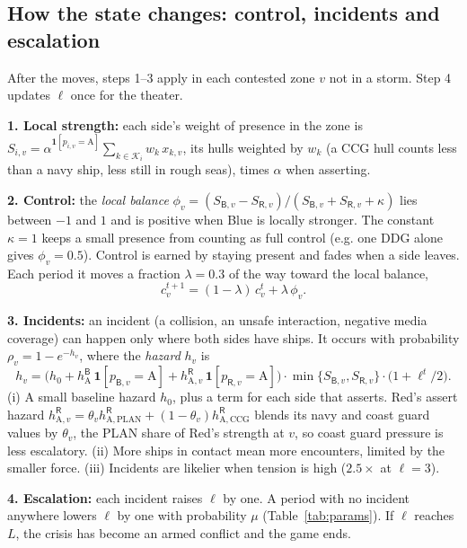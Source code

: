 \documentclass[10pt]{article}
\newcommand{\K}{\mathcal{K}}
\newcommand{\1}{\mathbf{1}}
\newcommand{\B}{\mathsf{B}}
\newcommand{\Rd}{\mathsf{R}}
\newcommand{\As}{\mathrm{A}}
\begin{document}
\subsection{How the state changes: control, incidents and escalation}\label{sec:dynamics}
After the moves, steps 1--3 apply in each contested zone $v$ not in a storm. Step 4 updates $\ell$ once for the theater.

\textbf{1. Local strength:} each side's weight of presence in the zone is
$S_{i,v}=\alpha^{\1[p_{i,v}=\As]}\sum_{k\in\K_i}w_k\,x_{k,v}$, its hulls weighted by $w_k$ (a CCG hull counts less
than a navy ship, less still in rough seas), times $\alpha$ when asserting.

\textbf{2. Control:} the \emph{local balance}
$\phi_v=(S_{\B,v}-S_{\Rd,v})/(S_{\B,v}+S_{\Rd,v}+\kappa)$ lies between $-1$ and $1$ and is positive when Blue is
locally stronger. The constant $\kappa=1$ keeps a small presence from counting as full control (e.g. one DDG alone gives
$\phi_v=0.5$). Control is earned by staying present and fades when a side leaves. Each period it moves a fraction
$\lambda=0.3$ of the way toward the local balance,
\begin{equation}
c^{t+1}_v=(1-\lambda)\,c^t_v+\lambda\,\phi_v .\label{eq:control}
\end{equation}

\textbf{3. Incidents:} an incident (a collision, an unsafe interaction, negative media coverage) can happen only
where both sides have ships. It occurs with probability $\rho_v=1-e^{-h_v}$, where the \emph{hazard} $h_v$ is
\begin{equation}
h_v=\big(h_0+h^\B_\As\,\1[p_{\B,v}=\As]+h^\Rd_{\As,v}\,\1[p_{\Rd,v}=\As]\big)\cdot\min\{S_{\B,v},S_{\Rd,v}\}
\cdot\big(1+\ell^t/2\big).\label{eq:hazard}
\end{equation}
(i) A small baseline hazard $h_0$, plus a term for each side that asserts. Red's assert
hazard $h^\Rd_{\As,v}=\theta_v h^\Rd_{\As,\text{PLAN}}+(1-\theta_v)h^\Rd_{\As,\text{CCG}}$ blends its navy and coast
guard values by $\theta_v$, the PLAN share of Red's strength at $v$, so coast guard pressure is less escalatory.
(ii) More ships in contact mean more encounters, limited by the smaller force. (iii) Incidents are likelier when
tension is high ($2.5\times$ at $\ell=3$).

\textbf{4. Escalation:} each incident raises $\ell$ by one. A period with no incident anywhere lowers $\ell$ by one
with probability $\mu$ (Table~\ref{tab:params}). If $\ell$ reaches $L$, the crisis has become an armed conflict and the game ends.
\end{document}
